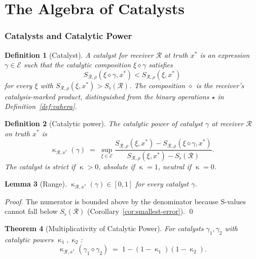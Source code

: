 \documentclass[twocolumn,a4paper]{article}
\newtheorem{theorem}{Theorem}[section]
\newtheorem{lemma}[theorem]{Lemma}
\newtheorem{definition}[theorem]{Definition}
\DeclareMathOperator{\catpow}{\kappa}
\newcommand{\Expr}{\mathcal{E}}
\newcommand{\receiver}{\mathcal{R}}
\newcommand{\Sscalar}{S}
\newcommand{\Sfloor}{S_{\flat}}
\begin{document}
\part{The Algebra of Catalysts}

\section{Catalysts and Catalytic Power}
\label{sec:catalysts}

\begin{definition}[Catalyst]
\label{def:catalyst}
A \emph{catalyst} for receiver $\receiver$ at truth $x^{*}$ is an expression $\gamma\in\Expr$ such that the catalytic composition $\xi\diamond\gamma$ satisfies
\[
\Sscalar_{\receiver,\rho}(\xi\diamond\gamma,x^{*})<\Sscalar_{\receiver,\rho}(\xi,x^{*})
\]
for every $\xi$ with $\Sscalar_{\receiver,\rho}(\xi,x^{*})>\Sfloor(\receiver)$. The composition $\diamond$ is the receiver's catalysis-marked product, distinguished from the binary operations $\star$ in Definition~\ref{def:vahera}.
\end{definition}

\begin{definition}[Catalytic power]
\label{def:catalytic-power}
The \emph{catalytic power} of catalyst $\gamma$ at receiver $\receiver$ on truth $x^{*}$ is
\[
\catpow_{\receiver,x^{*}}(\gamma)\;=\;\sup_{\xi\in\Expr}\frac{\Sscalar_{\receiver,\rho}(\xi,x^{*})-\Sscalar_{\receiver,\rho}(\xi\diamond\gamma,x^{*})}{\Sscalar_{\receiver,\rho}(\xi,x^{*})-\Sfloor(\receiver)}.
\]
The catalyst is \emph{strict} if $\catpow>0$, \emph{absolute} if $\catpow=1$, \emph{neutral} if $\catpow=0$.
\end{definition}

\begin{lemma}[Range]
\label{lem:cat-range}
$\catpow_{\receiver,x^{*}}(\gamma)\in[0,1]$ for every catalyst $\gamma$.
\end{lemma}

\begin{proof}
The numerator is bounded above by the denominator because S-values cannot fall below $\Sfloor(\receiver)$ (Corollary~\ref{cor:smallest-error}). \qed
\end{proof}

\begin{theorem}[Multiplicativity of Catalytic Power]
\label{thm:multiplicativity}
For catalysts $\gamma_{1},\gamma_{2}$ with catalytic powers $\catpow_{1},\catpow_{2}$:
\[
\catpow_{\receiver,x^{*}}(\gamma_{1}\diamond\gamma_{2})\;=\;1-(1-\catpow_{1})(1-\catpow_{2}).
\]
\end{theorem}
\end{document}
